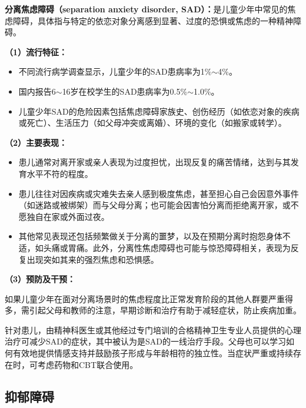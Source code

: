 \begin{keybox}
\textbf{分离焦虑障碍（separation anxiety disorder, SAD）：}是儿童少年中常见的焦虑障碍，具体指与特定的依恋对象分离感到显著、过度的恐惧或焦虑的一种精神障碍。

\vspace{4pt}
\textbf{（1）流行特征：}

\begin{itemize}[leftmargin=*]
    \item 不同流行病学调查显示，儿童少年的SAD患病率为1\%$\sim$4\%。
    \item 国内报告6$\sim$16岁在校学生的SAD患病率为0.5\%$\sim$1.0\%。
    \item 儿童少年SAD的危险因素包括焦虑障碍家族史、创伤经历（如依恋对象的疾病或死亡）、生活压力（如父母冲突或离婚）、环境的变化（如搬家或转学）。
\end{itemize}

\vspace{4pt}
\textbf{（2）主要表现：}

\begin{itemize}[leftmargin=*]
    \item 患儿通常对离开家或亲人表现为过度担忧，出现反复的痛苦情绪，达到与其发育水平不符的程度。
    \item 患儿往往对因疾病或灾难失去亲人感到极度焦虑，甚至担心自己会因意外事件（如迷路或被绑架）而与父母分离；也可能会因害怕分离而拒绝离开家，或不愿独自在家或外面过夜。
    \item 其他常见表现还包括频繁做关于分离的噩梦，以及在预期分离时抱怨身体不适，如头痛或胃痛。此外，分离性焦虑障碍也可能与惊恐障碍相关，表现为反复出现突如其来的强烈焦虑和恐惧感。
\end{itemize}

\vspace{4pt}
\textbf{（3）预防及干预：}

如果儿童少年在面对分离场景时的焦虑程度比正常发育阶段的其他人群要严重得多，需引起父母和教师的注意，早期诊断和治疗有助于减轻症状，防止疾病加重。

针对患儿，由精神科医生或其他经过专门培训的合格精神卫生专业人员提供的心理治疗可减少SAD的症状，其中被认为是SAD的一线治疗手段。父母也可以学习如何有效地提供情感支持并鼓励孩子形成与年龄相符的独立性。当症状严重或持续存在时，可考虑药物和CBT联合使用。
\end{keybox}

\subsection{抑郁障碍}

